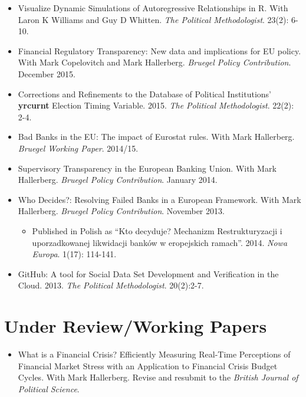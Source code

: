 \documentclass[a4paper]{article}
\begin{document}
{\begin{itemize}
    \item Visualize Dynamic Simulations of Autoregressive Relationships in R. With Laron K Williams and Guy D Whitten. \emph{The Political Methodologist}. 23(2): 6-10.

    \item Financial Regulatory Transparency: New data and implications for EU policy. With Mark Copelovitch and Mark Hallerberg. \emph{Bruegel Policy Contribution}. December 2015.

    \item Corrections and Refinements to the Database of Political Institutions' \textbf{yrcurnt} Election Timing Variable. 2015. {\emph{The Political Methodologist}}. 22(2): 2-4.

    \item Bad Banks in the EU: The impact of Eurostat rules. With Mark Hallerberg. \emph{Bruegel Working Paper}. 2014/15.

    \item Supervisory Transparency in the European Banking Union. With Mark Hallerberg. {\emph{Bruegel Policy Contribution}}. January 2014.

    \item Who Decides?: Resolving Failed Banks in a European Framework. With Mark Hallerberg. {\emph{Bruegel Policy Contribution}}. November 2013.

      \begin{itemize}
        \item Published in Polish as ``Kto decyduje? Mechanizm Restrukturyzacji i uporzadkowanej likwidacji bank\'{o}w w eropejskich ramach''. 2014. \emph{Nowa Europa}. 1(17): 114-141.
      \end{itemize}

    \item GitHub: A tool for Social Data Set Development and Verification in the Cloud. 2013. {\emph{The Political Methodologist}}. 20(2):2-7.

\end{itemize}


\section*{Under Review/Working Papers}

\begin{itemize}

    \item What is a Financial Crisis? Efficiently Measuring Real-Time Perceptions of Financial Market Stress with an Application to Financial Crisis Budget Cycles. With Mark Hallerberg. Revise and resubmit to the \emph{British Journal of Political Science}.


\end{itemize}}
\end{document}
